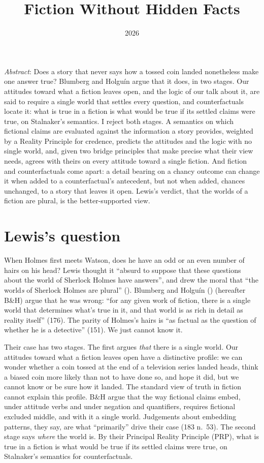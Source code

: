 \documentclass[
  11pt,
  letterpaper,
  DIV=11,
  numbers=noendperiod,
  twoside]{scrartcl}
\title{Fiction Without Hidden Facts}
\author{}
\date{2026}
\newcounter{none} %
\renewenvironment{abstract}
 {\vspace{-1.25cm}
 \quotation\small\noindent\emph{Abstract}:}
 {\endquotation}
\renewenvironment{abstract}
 {\quotation\small\noindent\emph{Abstract}:}
 {\endquotation\vspace{-0.02cm}}
\renewcommand{\textsc}[1]{{\scfont #1}}
\begin{document}
\maketitle
\begin{abstract}
Does a story that never says how a tossed coin landed nonetheless make
one answer true? Blumberg and Holguín argue that it does, in two stages.
Our attitudes toward what a fiction leaves open, and the logic of our
talk about it, are said to require a single world that settles every
question, and counterfactuals locate it: what is true in a fiction is
what would be true if its settled claims were true, on Stalnaker's
semantics. I reject both stages. A semantics on which fictional claims
are evaluated against the information a story provides, weighted by a
Reality Principle for credence, predicts the attitudes and the logic
with no single world, and, given two bridge principles that make precise
what their view needs, agrees with theirs on every attitude toward a
single fiction. And fiction and counterfactuals come apart: a detail
bearing on a chancy outcome can change it when added to a
counterfactual's antecedent, but not when added, chances unchanged, to a
story that leaves it open. Lewis's verdict, that the worlds of a fiction
are plural, is the better-supported view.
\end{abstract}


\section{Lewis's question}\label{sec-intro}

When Holmes first meets Watson, does he have an odd or an even number of
hairs on his head? Lewis thought it ``absurd to suppose that these
questions about the world of Sherlock Holmes have answers'', and drew
the moral that ``the world\emph{s} of Sherlock Holmes are plural''
(). Blumberg and Holguín
() (hereafter B\&H) argue that
he was wrong: ``for any given work of fiction, there is a single world
that determines what's true in it, and that world is as rich in detail
as reality itself'' (176). The parity of Holmes's hairs is ``as factual
as the question of whether he is a detective'' (151). We just cannot
know it.

Their case has two stages. The first argues \emph{that} there is a
single world. Our attitudes toward what a fiction leaves open have a
distinctive profile: we can wonder whether a coin tossed at the end of a
television series landed heads, think a biased coin more likely than not
to have done so, and hope it did, but we cannot know or be sure how it
landed. The standard view of truth in fiction cannot explain this
profile. B\&H argue that the way fictional claims embed, under attitude
verbs and under negation and quantifiers, requires fictional excluded
middle, and with it a single world. Judgements about embedding patterns,
they say, are what ``primarily'' drive their case (183 n.~53). The
second stage says \emph{where} the world is. By their \textsc{Principal
Reality Principle} (PRP), what is true in a fiction is what would be
true if its settled claims were true, on Stalnaker's semantics for
counterfactuals.
\end{document}
